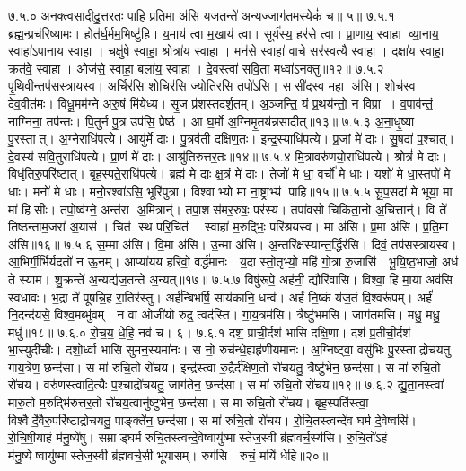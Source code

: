 ७.५.०
अ॒न॒क्त्व॒सा॒दी॒दु॒त्त॒र॒तः पा॑हि प्रति॒मा अ॑सि यज॒तन्ते॑ अ॒न्यज्जाग॑तम॒स्येकं॑ च॥ ५॥
\anuvakamend
७.५.१
ब्रह्म॒न्प्रच॑रिष्यामः। होत॑र्घ॒र्मम॒भिष्टु॑हि। य॒माय॑ त्वा म॒खाय॑ त्वा। सूर्य॑स्य॒ हर॑से त्वा। प्रा॒णाय॒ स्वाहा व्या॒नाय॒ स्वाहा॑ऽपा॒नाय॒ स्वाहा। चक्षु॑षे॒ स्वाहा॒ श्रोत्रा॑य॒ स्वाहा। मन॑से॒ स्वाहा॑ वा॒चे सर॑स्वत्यै॒ स्वाहा। दक्षा॑य॒ स्वाहा॒ क्रत॑वे॒ स्वाहा। ओज॑से॒ स्वाहा॒ बला॑य॒ स्वाहा। दे॒वस्त्वा॑ सवि॒ता मध्वा॑ऽनक्तु॥१२॥
७.५.२
पृ॒थि॒वीन्तप॑सस्त्रायस्व। अ॒र्चिर॑सि शो॒चिर॑सि॒ ज्योति॑रसि॒ तपो॑ऽसि। ससी॑दस्व म॒हा अ॑सि। शोच॑स्व देव॒वीत॑मः। विधू॒मम॑ग्ने अरु॒षं मि॑येध्य। सृ॒ज प्र॑शस्तदर्\mbox{}श॒तम्। अ॒ञ्जन्ति॒ यं प्र॒थय॑न्तो॒ न विप्रा। व॒पाव॑न्तं॒ नाग्निना॒ तप॑न्तः। पि॒तुर्न पु॒त्र उप॑सि॒ प्रेष्ठ॑। आ घ॒र्मो अ॒ग्निमृ॒तय॑न्नसादीत्॥१३॥
७.५.३
अ॒ना॒धृ॒ष्या पु॒रस्तात्। अ॒ग्नेराधि॑पत्ये। आयु॑र्मे दाः। पु॒त्रव॑ती दक्षिण॒तः। इन्द्र॒स्याधि॑पत्ये। प्र॒जां मे॑ दाः। सु॒षदा॑ प॒श्चात्। दे॒वस्य॑ सवि॒तुराधि॑पत्ये। प्रा॒णं मे॑ दाः। आश्रु॑तिरुत्तर॒तः॥१४॥
७.५.४
मि॒त्रावरु॑णयो॒राधि॑पत्ये। श्रोत्रं॑ मे दाः। विधृ॑तिरु॒परि॑ष्टात्। बृह॒स्पते॒राधि॑पत्ये। ब्रह्म॑ मे दाः क्ष॒त्रं मे॑ दाः। तेजो॑ मे धा॒ वर्चो॑ मे धाः। यशो॑ मे धा॒स्तपो॑ मे धाः। मनो॑ मे धाः। मनो॒रश्वा॑ऽसि॒ भूरि॑पुत्रा। विश्वाभ्यो मा ना॒ष्ट्राभ्य॑ पाहि॥१५॥
७.५.५
सू॒प॒सदा॑ मे भूया॒ मा मा॑ हिसीः। तपो॒ष्व॑ग्ने॒ अन्त॑रा अ॒मित्रान्॑। तपा॒शस॑मर॒रुषः॒ पर॑स्य। तपा॑वसो चिकिता॒नो अ॒चित्तान्॑। वि ते॑ तिष्ठन्ताम॒जरा॑ अ॒यास॑। चित॑ स्थ परि॒चित॑। स्वाहा॑ म॒रुद्भिः॒ परि॑श्रयस्व। मा अ॑सि। प्र॒मा अ॑सि। प्र॒ति॒मा अ॑सि॥१६॥
७.५.६
स॒म्मा अ॑सि। वि॒मा अ॑सि। उ॒न्मा अ॑सि। अ॒न्तरि॑क्षस्यान्त॒र्द्धिर॑सि। दिवं॒ तप॑सस्त्रायस्व। आ॒भिर्गी॒र्भिर्यदतो॑ न ऊ॒नम्। आप्या॑यय हरिवो॒ वर्द्ध॑मानः। य॒दा स्तो॒तृभ्यो॒ महि॑ गो॒त्रा रु॒जासि॑। भू॒यि॒ष्ठ॒भाजो॒ अध॑ ते स्याम। शु॒क्रन्ते॑ अ॒न्यद्य॑ज॒तन्ते॑ अ॒न्यत्॥१७॥
७.५.७
विषु॑रूपे॒ अह॑नी॒ द्यौरि॑वासि। विश्वा॒ हि मा॒या अव॑सि स्वधावः। भ॒द्रा ते॑ पूषन्नि॒ह रा॒तिर॑स्तु। अर्\mbox{}ह॑न्बिभर्\mbox{}षि॒ साय॑कानि॒ धन्व॑। अर्\mbox{}हं नि॒ष्कं य॑ज॒तं  वि॒श्वरू॑पम्। अर्\mbox{}हं॑ नि॒दन्द॑यसे॒ विश्व॒मब्भु॑वम्। न वा ओजी॑यो रुद्र॒ त्वद॑स्ति। गा॒य॒त्रम॑सि। त्रैष्टु॑भमसि। जाग॑तमसि। मधु॒ मधु॒ मधु॑॥१८॥
७.६.०
रो॒च॒य॒ धे॒हि॒ नव॑ च। ६।
\anuvakamend
७.६.१
दश॒ प्राची॒र्दश॑ भासि दक्षि॒णा। दश॑ प्र॒तीची॒र्दश॑ भा॒स्युदी॑चीः। दशो॒र्ध्वा भा॑सि सुमन॒स्यमा॑नः। स नो॒ रुच॑न्धे॒ह्यहृ॑णीयमानः। अ॒ग्निष्ट्वा॒ वसु॑भिः पु॒रस्ताद्रोचयतु गाय॒त्रेण॒ छन्द॑सा। स मा॑ रुचि॒तो रो॑चय। इन्द्र॑स्त्वा रु॒द्रैर्द॑क्षिण॒तो रो॑चयतु॒ त्रैष्टु॑भेन॒ छन्द॑सा। स मा॑ रुचि॒तो रो॑चय। वरु॑णस्त्वादि॒त्यैः प॒श्चाद्रो॑चयतु॒ जाग॑तेन॒ छन्द॑सा। स मा॑ रुचि॒तो रो॑चय॥१९॥
७.६.२
द्यु॒ता॒नस्त्वा॑ मारु॒तो म॒रुद्भि॑रुत्तर॒तो रो॑चय॒त्वानु॑ष्टुभेन॒ छन्द॑सा। स मा॑ रुचि॒तो रो॑चय। बृह॒स्पति॑स्त्वा॒ विश्वैर्दे॒वैरु॒परि॑ष्टाद्रोचयतु॒ पाङ्क्ते॑न॒ छन्द॑सा। स मा॑ रुचि॒तो रो॑चय। रो॒चि॒तस्त्वन्दे॑व घर्म दे॒वेष्वसि॑। रो॒चि॒षी॒याहं म॑नु॒ष्ये॑षु। सम्राड्घर्म रुचि॒तस्त्वन्दे॒वेष्वायु॑ष्मास्तेज॒स्वी ब्र॑ह्मवर्च॒स्य॑सि। रु॒चि॒तो॑ऽहं म॑नु॒ष्येष्वायु॑ष्मास्तेज॒स्वी ब्र॑ह्मवर्च॒सी भू॑यासम्। रुग॑सि। रुचं॒ मयि॑ धेहि॥२०॥
